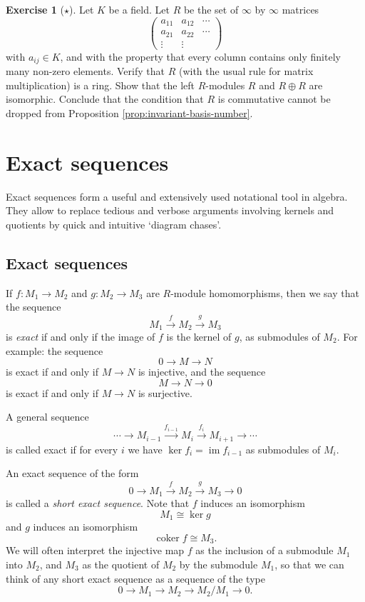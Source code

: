 \documentclass[11pt]{amsbook}
\newcommand{\longto}{\longrightarrow}
\DeclareMathOperator\im{im}
\DeclareMathOperator\coker{coker}
\theoremstyle{plain}
\theoremstyle{definition}
\newtheorem{exercise}{Exercise}
\begin{document}
\begin{exercise}[$\star$]\label{exc:no-well-defined-rank}
Let $K$ be a field. Let $R$ be the set of $\infty$ by $\infty$ matrices 
\[
\left(\begin{array}{ccc}a_{11} & a_{12} & \cdots \\a_{21} & a_{22} & \cdots \\\vdots & \vdots & \end{array}\right)
\]
with $a_{ij} \in K$, and with the property that every column contains only finitely many non-zero elements. Verify that $R$ (with the usual rule for matrix multiplication) is a ring. Show that the left $R$-modules $R$ and $R\oplus R$ are isomorphic. Conclude that the condition that $R$ is commutative cannot be dropped from Proposition \ref{prop:invariant-basis-number}.
\end{exercise}



\chapter{Exact sequences}

Exact sequences form a useful and extensively used notational tool in algebra. They allow to replace tedious and verbose arguments involving kernels and quotients by quick and intuitive `diagram chases'. 


\section{Exact sequences}


If $f\colon M_1\to M_2$ and $g\colon M_2\to M_3$ are $R$-module homomorphisms, then we say that the sequence
\[
	M_1 \overset{f}{\longto} M_2 \overset{g}{\longto} M_3
\]
is \emph{exact} if and only if the image of $f$ is the kernel of $g$, as submodules of $M_2$. For example: the sequence
\[
	0 \longto M \longto N
\]
is exact if and only if $M\to N$ is injective, and the sequence
\[
	M \longto N \longto 0
\]
is exact if and only if $M\to N$ is surjective. 

A general sequence
\[
	\cdots \longto M_{i-1} \overset{f_{i-1}}{\longto} M_i \overset{f_{i}}{\longto}  M_{i+1} \longto \cdots
\]
is called exact if for every $i$ we have $\ker f_i = \im f_{i-1}$ as submodules of $M_i$.  


An exact sequence of the form
\[
	0 \longto M_1 \overset{f}{\longto} M_2 \overset{g}{\longto} M_3 \longto 0
\]
is called a \emph{short exact sequence}. Note that $f$ induces an isomorphism
\[
	M_1 \cong \ker g
\]
and $g$ induces an isomorphism
\[
	\coker f  \cong M_3.
\]
We will often interpret the injective map $f$ as the inclusion of a submodule $M_1$ into $M_2$, and $M_3$ as the quotient of $M_2$ by the submodule $M_1$, so that we can think of any short exact sequence as 
a sequence of the type
\[
	0 \longto M_1 \longto M_2 \longto M_2/M_1 \longto 0.
\]
\end{document}

